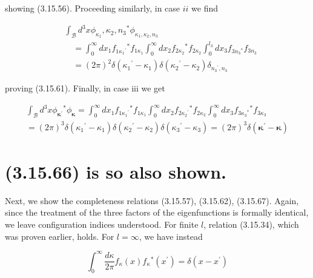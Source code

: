 \documentclass{article}
\begin{document}
showing (3.15.56). Proceeding similarly, in case $i i$ we find
 
\begin{align*}
& \int_{\mathcal{B}} d^{3} x \phi_{\kappa_{1}}, \kappa_{2}, n_{3}{ }^{*} \phi_{\kappa_{1}, \kappa_{2}, n_{3}}  \tag{3.15.73}\\
& \quad=\int_{0}^{\infty} d x_{1} f_{1 \kappa_{1}{ }^{\prime}}{ }^{*} f_{1 \kappa_{1}} \int_{0}^{\infty} d x_{2} f_{2 \kappa_{2}}{ }^{*} f_{2 \kappa_{2}} \int_{0}^{l_{3}} d x_{3} f_{3 n_{3}{ }{ }^{*}} f_{3 n_{3}} \\
& \quad=(2 \pi)^{2} \delta\left(\kappa_{1}{ }^{\prime}-\kappa_{1}\right) \delta\left(\kappa_{2}{ }^{\prime}-\kappa_{2}\right) \delta_{n_{3}{ }^{\prime}, n_{3}}
\end{align*}
 
proving (3.15.61). Finally, in case iii we get
 
\begin{align*}
\int_{\mathcal{B}} d^{3} x \phi_{\boldsymbol{\kappa}^{\prime}}{ }^{*} \phi_{\boldsymbol{\kappa}}=\int_{0}^{\infty} d x_{1} f_{1 \kappa_{1}{ }^{\prime}}{ }^{*} f_{1 \kappa_{1}} \int_{0}^{\infty} d x_{2} f_{2 \kappa_{2}{ }^{\prime}}{ }^{*} f_{2 \kappa_{2}} \int_{0}^{\infty} d x_{3} f_{3 \kappa_{3}{ }^{*}}{ }^{*} f_{3 \kappa_{3}}  \tag{3.15.74}\\
=(2 \pi)^{3} \delta\left(\kappa_{1}{ }^{\prime}-\kappa_{1}\right) \delta\left(\kappa_{2}{ }^{\prime}-\kappa_{2}\right) \delta\left(\kappa_{3}{ }^{\prime}-\kappa_{3}\right)=(2 \pi)^{3} \delta\left(\boldsymbol{\kappa}^{\prime}-\boldsymbol{\kappa}\right)
\end{align*}
 

\section*{(3.15.66) is so also shown.}

Next, we show the completeness relations (3.15.57), (3.15.62), (3.15.67). Again, since the treatment of the three factors of the eigenfunctions is formally identical, we leave configuration indices understood. For finite $l$, relation (3.15.34), which was proven earlier, holds. For $l=\infty$, we have instead
 
\begin{equation*}
\int_{0}^{\infty} \frac{d \kappa}{2 \pi} f_{\kappa}(x) f_{\kappa}{ }^{*}\left(x^{\prime}\right)=\delta\left(x-x^{\prime}\right) \tag{3.15.75}
\end{equation*}
 
\end{document}
